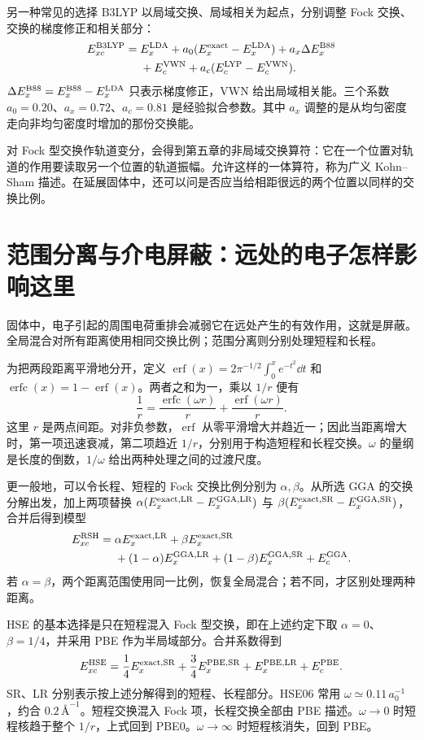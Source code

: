 另一种常见的选择 B3LYP 以局域交换、局域相关为起点，分别调整 Fock 交换、交换的梯度修正和相关部分：
\begin{align}
E_{xc}^{\rm B3LYP}={}&E_x^{\rm LDA}
+a_0(E_x^{\rm exact}-E_x^{\rm LDA})
+a_x\Delta E_x^{\rm B88}\notag\\
&+E_c^{\rm VWN}+a_c(E_c^{\rm LYP}-E_c^{\rm VWN}).
\end{align}
$\Delta E_x^{\rm B88}=E_x^{\rm B88}-E_x^{\rm LDA}$ 只表示梯度修正，VWN 给出局域相关能。三个系数 $a_0=0.20$、$a_x=0.72$、$a_c=0.81$ 是经验拟合参数。其中 $a_x$ 调整的是从均匀密度走向非均匀密度时增加的那份交换能。

对 Fock 型交换作轨道变分，会得到第五章的非局域交换算符：它在一个位置对轨道的作用要读取另一个位置的轨道振幅。允许这样的一体算符，称为广义 Kohn--Sham 描述。在延展固体中，还可以问是否应当给相距很远的两个位置以同样的交换比例。

\section{范围分离与介电屏蔽：远处的电子怎样影响这里}
固体中，电子引起的周围电荷重排会减弱它在远处产生的有效作用，这就是屏蔽。全局混合对所有距离使用相同交换比例；范围分离则分别处理短程和长程。

为把两段距离平滑地分开，定义 $\operatorname{erf}(x)=2\pi^{-1/2}\int_0^x e^{-t^2}\dd t$ 和 $\operatorname{erfc}(x)=1-\operatorname{erf}(x)$。两者之和为一，乘以 $1/r$ 便有
\begin{equation}
\frac1r=\frac{\operatorname{erfc}(\omega r)}r+
\frac{\operatorname{erf}(\omega r)}r.
\end{equation}
这里 $r$ 是两点间距。对非负参数，$\operatorname{erf}$ 从零平滑增大并趋近一；因此当距离增大时，第一项迅速衰减，第二项趋近 $1/r$，分别用于构造短程和长程交换。$\omega$ 的量纲是长度的倒数，$1/\omega$ 给出两种处理之间的过渡尺度。

更一般地，可以令长程、短程的 Fock 交换比例分别为 $\alpha,\beta$。从所选 GGA 的交换分解出发，加上两项替换
$\alpha(E_x^{\rm exact,LR}-E_x^{\rm GGA,LR})$
与 $\beta(E_x^{\rm exact,SR}-E_x^{\rm GGA,SR})$，合并后得到模型
\begin{align}
E_{xc}^{\rm RSH}={}&\alpha E_x^{\rm exact,LR}+\beta E_x^{\rm exact,SR}\notag\\
&+(1-\alpha)E_x^{\rm GGA,LR}+(1-\beta)E_x^{\rm GGA,SR}+E_c^{\rm GGA}.
\end{align}
若 $\alpha=\beta$，两个距离范围使用同一比例，恢复全局混合；若不同，才区别处理两种距离。

HSE 的基本选择是只在短程混入 Fock 型交换，即在上述约定下取 $\alpha=0$、$\beta=1/4$，并采用 PBE 作为半局域部分。合并系数得到
\begin{equation}
E_{xc}^{\rm HSE}=\frac14E_x^{\rm exact,SR}
+\frac34E_x^{\rm PBE,SR}+E_x^{\rm PBE,LR}+E_c^{\rm PBE}.
\end{equation}
SR、LR 分别表示按上述分解得到的短程、长程部分。HSE06 常用 $\omega\simeq0.11\,a_0^{-1}$，约合 $0.2\,\text{\AA}^{-1}$。短程交换混入 Fock 项，长程交换全部由 PBE 描述。$\omega\to0$ 时短程核趋于整个 $1/r$，上式回到 PBE0。$\omega\to\infty$ 时短程核消失，回到 PBE。

